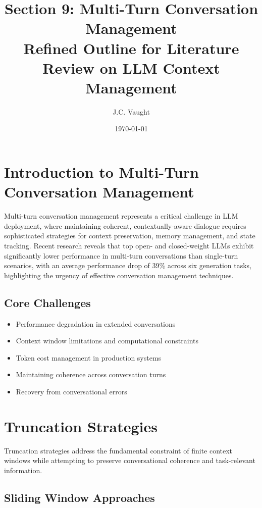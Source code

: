 \documentclass[11pt,letterpaper]{article}
\title{\textbf{\color{garnet}Section 9: Multi-Turn Conversation Management}\\
\large{Refined Outline for Literature Review on LLM Context Management}}
\author{J.C. Vaught}
\date{\today}
\begin{document}
\maketitle

\section{Introduction to Multi-Turn Conversation Management}

Multi-turn conversation management represents a critical challenge in LLM deployment, where maintaining coherent, contextually-aware dialogue requires sophisticated strategies for context preservation, memory management, and state tracking. Recent research reveals that top open- and closed-weight LLMs exhibit significantly lower performance in multi-turn conversations than single-turn scenarios, with an average performance drop of 39\% across six generation tasks, highlighting the urgency of effective conversation management techniques.

\subsection{Core Challenges}
\begin{itemize}[leftmargin=*]
    \item Performance degradation in extended conversations
    \item Context window limitations and computational constraints
    \item Token cost management in production systems
    \item Maintaining coherence across conversation turns
    \item Recovery from conversational errors
\end{itemize}

\section{Truncation Strategies}

Truncation strategies address the fundamental constraint of finite context windows while attempting to preserve conversational coherence and task-relevant information.

\subsection{Sliding Window Approaches}
\end{document}
